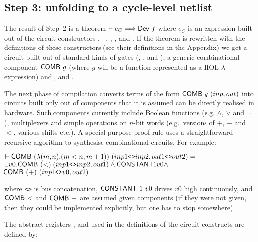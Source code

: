 \documentclass{llncs}
\begin{document}
\vspace*{-3mm}

\subsection*{Step 3: unfolding to a cycle-level netlist}

The result of Step~2 is a theorem
$\vdash e_C \Longrightarrow \mathsf{Dev}~f$ where $e_C$ is an expression built out of the circuit
constructors , 
, , , ,  and . If the theorem
is rewritten with the definitions of these constructors (see their
definitions in the Appendix) we get a circuit built out of standard
kinds of gates (, ,  and ), a
generic combinational component $\mathsf{COMB}~g$ (where $g$ will be a
function represented as a HOL $\lambda$-expression) and 
,  and . 

The next phase of compilation converts terms of the form $\mathsf{COMB}~g~(inp,out)$
into circuits built only out of components that it is assumed can be directly realised in
hardware. Such components  currently include Boolean functions (e.g. $\wedge$,
$\vee$ and $\neg$), multiplexers and simple operations  on $n$-bit words (e.g.~versions
of $+$, $-$ and $<$, various shifts etc.). 
A special purpose proof rule uses a straightforward recursive algorithm to synthesise
combinational circuits. For example:


{\begin{alltt}
\( \vdash \DEF{COMB}\ ({\lambda}(m,n). (m<n, m+1))\ (inp1\texttt{<>}inp2,out1\texttt{<>}out2) =              \)
\(     {\exists}v0. \DEF{COMB}\ ({<})\ (inp1\texttt{<>}inp2,out1) \wedge \DEF{CONSTANT} 1 v0 \wedge \)
\(         \! \DEF{COMB}\ ({+})\ (inp1\texttt{<>}v0,out2)                                              \)
\end{alltt}}

\vspace*{-1mm}

\noindent where \texttt{<>} is bus concatenation,
$\mathsf{CONSTANT}~1~v0$ drives $v0$ high continuously, and
$\mathsf{COMB}~{<}$ and $\mathsf{COMB}~{+}$ are assumed
given components (if they were not given, then they could be
implemented explicitly, but one has to stop somewhere). 
 
The abstract registers ,  and  used in the definitions of
the circuit constructs are defined by:
\end{document}

